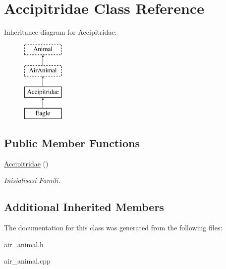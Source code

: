 \hypertarget{class_accipitridae}{}\section{Accipitridae Class Reference}
\label{class_accipitridae}
Inheritance diagram for Accipitridae\+:\begin{figure}[H]
\begin{center}
\leavevmode
\includegraphics[height=4.000000cm]{class_accipitridae}
\end{center}
\end{figure}
\subsection*{Public Member Functions}
\begin{DoxyCompactItemize}
\item 
\hyperlink{class_accipitridae_adfc1c25ca2fa1de73bb75930f71fd23e}{Accipitridae} ()\hypertarget{class_accipitridae_adfc1c25ca2fa1de73bb75930f71fd23e}{}\label{class_accipitridae_adfc1c25ca2fa1de73bb75930f71fd23e}

\begin{DoxyCompactList}\small\item\em Inisialisasi Famili. \end{DoxyCompactList}\end{DoxyCompactItemize}
\subsection*{Additional Inherited Members}


The documentation for this class was generated from the following files\+:\begin{DoxyCompactItemize}
\item 
air\+\_\+animal.\+h\item 
air\+\_\+animal.\+cpp\end{DoxyCompactItemize}
